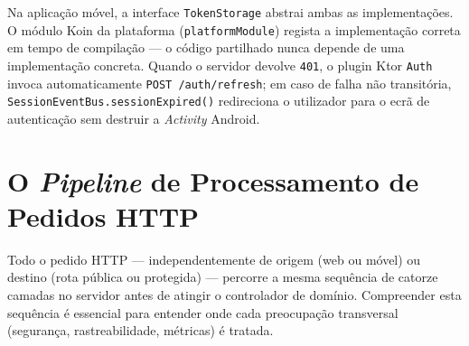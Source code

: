 Na aplicação móvel, a interface \texttt{TokenStorage} abstrai ambas as
implementações.
O módulo Koin da plataforma (\texttt{platformModule}) regista a
implementação correta em tempo de compilação — o código partilhado nunca
depende de uma implementação concreta.
Quando o servidor devolve \texttt{401}, o plugin Ktor \texttt{Auth}
invoca automaticamente \texttt{POST /auth/refresh}; em caso de falha
não transitória, \texttt{SessionEventBus.sessionExpired()} redireciona
o utilizador para o ecrã de autenticação sem destruir a \textit{Activity}
Android.

\section{O \textit{Pipeline} de Processamento de Pedidos HTTP}
\label{sec:pipeline_http}

Todo o pedido HTTP — independentemente de origem (web ou móvel) ou
destino (rota pública ou protegida) — percorre a mesma sequência de
catorze camadas no servidor antes de atingir o controlador de domínio.
Compreender esta sequência é essencial para entender onde cada
preocupação transversal (segurança, rastreabilidade, métricas) é tratada.

